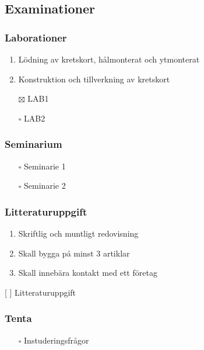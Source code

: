 \documentclass[11pt]{article}
\begin{document}
\subsection{Examinationer}
\label{sec:orgeb96722}
\subsubsection{Laborationer}
\label{sec:org9ebd0fc}
\begin{enumerate}
\item Lödning av kretskort, hålmonterat och ytmonterat
\item Konstruktion och tillverkning av kretskort
\end{enumerate}


\begin{itemize}
\item[{$\boxtimes$}] LAB1
\item[{$\square$}] LAB2
\end{itemize}

\subsubsection{Seminarium}
\label{sec:org43d6fce}
\begin{itemize}
\item[{$\square$}] Seminarie 1
\item[{$\square$}] Seminarie 2
\end{itemize}

\subsubsection{Litteraturuppgift}
\label{sec:org647f6b1}
\begin{enumerate}
\item Skriftlig och muntligt redovisning
\item Skall bygga på minst 3 artiklar
\item Skall innebära kontakt med ett företag
\end{enumerate}


[ ] Litteraturuppgift


\subsubsection{Tenta}
\label{sec:org5b65637}
\begin{itemize}
\item[{$\square$}] Instuderingsfrågor
\end{itemize}
\end{document}
